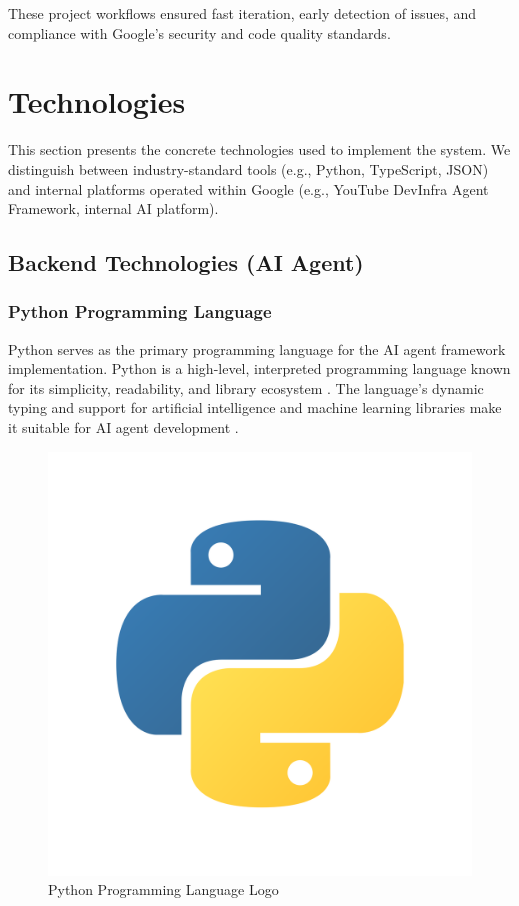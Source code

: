 \begin{spacing}{1.2}
These project workflows ensured fast iteration, early detection of issues, and compliance with Google's security and code quality standards.



\section{Technologies}

This section presents the concrete technologies used to implement the system. We distinguish between industry-standard tools (e.g., Python, TypeScript, JSON) and internal platforms operated within Google (e.g., YouTube DevInfra Agent Framework, internal AI platform).

\subsection{Backend Technologies (AI Agent)}

\subsubsection{Python Programming Language}
Python serves as the primary programming language for the AI agent framework implementation. Python is a high-level, interpreted programming language known for its simplicity, readability, and library ecosystem \cite{van1995python}. The language's dynamic typing and support for artificial intelligence and machine learning libraries make it suitable for AI agent development \cite{pedregosa2011scikit}.

\begin{figure}[H]
    \centering
    \includegraphics[scale=0.02]{Images/python_logo.png}
    \caption{Python Programming Language Logo}
    \label{fig:python_logo}
\end{figure}



\end{spacing}
